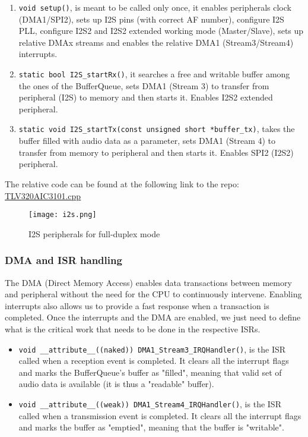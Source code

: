 \documentclass[10pt,a4]{article}
\begin{document}
\begin{enumerate}
    \item \lstinline{void setup()}, is meant to be called only once, it enables peripherals clock (DMA1/SPI2), sets up I2S pins (with correct AF number), configure I2S PLL, configure I2S2 and I2S2 extended working mode (Master/Slave), sets up relative DMAx streams and enables the relative DMA1 (Stream3/Stream4) interrupts.
    \item \lstinline{static bool I2S_startRx()}, it searches a free and writable buffer among the ones of the BufferQueue, sets DMA1 (Stream 3) to transfer from peripheral (I2S) to memory and then starts it. Enables I2S2 extended peripheral.

    \item \lstinline{static void I2S_startTx(const unsigned short *buffer_tx)}, takes the buffer filled with audio data as a parameter, sets DMA1 (Stream 4) to transfer from memory to peripheral and then starts it. Enables SPI2 (I2S2) peripheral.
\end{enumerate}

The relative code can be found at the following link to the repo:
\href{https://github.com/AleDedor/STM32Nucleo-Codec-Shield/blob/main/NASlib/TLV320AIC3101.cpp}{\underline{TLV320AIC3101.cpp}}

    \begin{figure}[ht]
        \centering
        \texttt{[image: i2s.png]}
        \caption{I2S peripherals for full-duplex mode}
    \end{figure}

\subsubsection{DMA and ISR handling}
The DMA (Direct Memory Access) enables data transactions between memory and peripheral without the need for the CPU to continuously intervene. Enabling interrupts also allows us to provide a fast response when a transaction is completed. Once the interrupts and the DMA are enabled, we just need to define what is the critical work that needs to be done in the respective ISRs.

\begin{itemize}
    \item \lstinline{void __attribute__((naked)) DMA1_Stream3_IRQHandler()}, is the ISR called when a reception event is completed. It clears all the interrupt flags and marks the BufferQueue's buffer as "filled", meaning that valid set of audio data is available (it is thus a "readable" buffer).
    \item \lstinline{void __attribute__((weak)) DMA1_Stream4_IRQHandler()}, is the ISR called when a transmission event is completed. It clears all the interrupt flags and marks the buffer as "emptied", meaning that the buffer is "writable".
\end{itemize}
\end{document}
